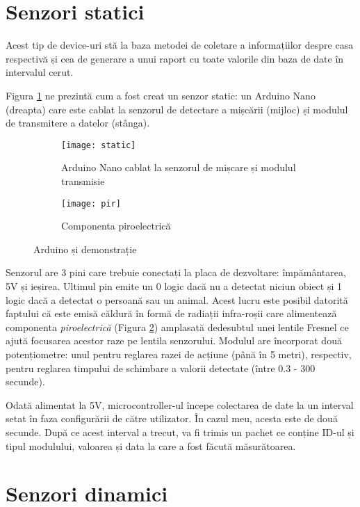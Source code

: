 \section{Senzori statici}

Acest tip de device-uri stă la baza metodei de coletare a informațiilor despre casa respectivă și cea de generare a unui raport cu toate valorile din baza de date în intervalul cerut.

Figura \ref{fig:static} ne prezintă cum a fost creat un senzor static: un Arduino Nano (dreapta) care este cablat la senzorul de detectare a mișcării (mijloc) și modulul de transmitere a datelor (stânga). 

\begin{figure}[h]
	\centering
	\begin{subfigure}{0.45\textwidth}
		\centering
		\texttt{[image: static]}
		\caption{Arduino Nano cablat la senzorul de mișcare și modulul transmisie}
		\label{fig:static}
	\end{subfigure}
	\hfill
	\begin{subfigure}{0.45\textwidth}
		\centering
		\texttt{[image: pir]}
		\caption{Componenta piroelectrică}
		\label{fig:pir}
	\end{subfigure}
	\caption{Arduino și demonstrație}
	\label{fig:all2}
\end{figure}

Senzorul are 3 pini care trebuie conectați la placa de dezvoltare: împământarea, 5V și ieșirea. Ultimul pin emite un 0 logic dacă nu a detectat niciun obiect și 1 logic dacă a detectat o persoană sau un animal. Acest lucru este posibil datorită faptului că este emisă căldură în formă de radiații infra-roșii care alimentează componenta \emph{piroelectrică} (Figura \ref{fig:pir}) amplasată dedesubtul unei lentile Fresnel ce ajută focusarea acestor raze pe lentila senzorului. Modulul are încorporat două potențiometre: unul pentru reglarea razei de acțiune (până în 5 metri), respectiv, pentru reglarea timpului de schimbare a valorii detectate (între 0.3 - 300 secunde). 

Odată alimentat la 5V, microcontroller-ul începe colectarea de date la un interval setat în faza configurării de către utilizator. În cazul meu, acesta este de două secunde. După ce acest interval a trecut, va fi trimis un pachet ce conține ID-ul și tipul modulului, valoarea și data la care a fost făcută măsurătoarea. 

\section{Senzori dinamici}

